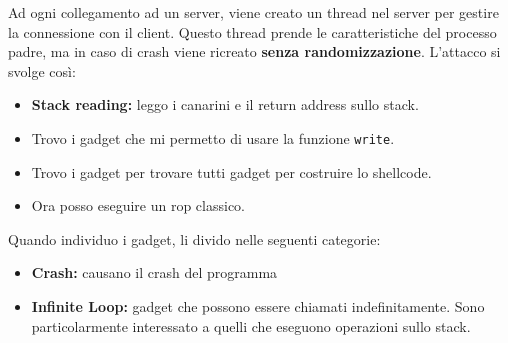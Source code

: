 \documentclass[a4paper,12pt]{article}
\begin{document}
Ad ogni collegamento ad un server, viene creato un thread nel server per gestire la connessione con il client. Questo thread prende le caratteristiche del processo padre, ma in caso di crash viene ricreato \textbf{senza randomizzazione}. L'attacco si svolge così:
\begin{itemize}
\item \textbf{Stack reading:} leggo i canarini e il return address sullo stack.
\item Trovo i gadget che mi permetto di usare la funzione \texttt{write}.
\item Trovo i gadget per trovare tutti gadget per costruire lo shellcode.
\item Ora posso eseguire un rop classico.
\end{itemize}
Quando individuo i gadget, li divido nelle seguenti categorie:
\begin{itemize}
\item \textbf{Crash:} causano il crash del programma
\item \textbf{Infinite Loop:} gadget che possono essere chiamati indefinitamente. Sono particolarmente interessato a quelli che eseguono operazioni sullo stack.
\end{itemize}
\end{document}
